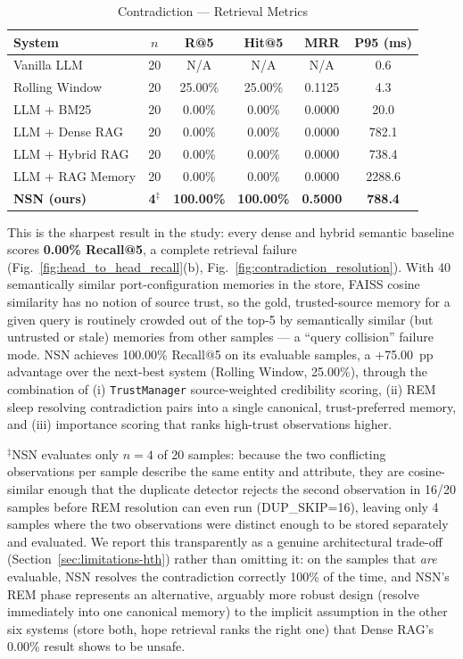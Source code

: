 \documentclass[conference]{IEEEtran}
\begin{document}
\begin{table}[t]
\caption{Contradiction --- Retrieval Metrics}
\label{tab:contra}
\centering
\scriptsize
\begin{tabular}{@{}lccccc@{}}
\toprule
\textbf{System} & $n$ & \textbf{R@5} & \textbf{Hit@5} & \textbf{MRR} & \textbf{P95 (ms)} \\
\midrule
Vanilla LLM & 20 & N/A & N/A & N/A & 0.6 \\
Rolling Window & 20 & 25.00\% & 25.00\% & 0.1125 & 4.3 \\
LLM + BM25 & 20 & 0.00\% & 0.00\% & 0.0000 & 20.0 \\
LLM + Dense RAG & 20 & 0.00\% & 0.00\% & 0.0000 & 782.1 \\
LLM + Hybrid RAG & 20 & 0.00\% & 0.00\% & 0.0000 & 738.4 \\
LLM + RAG Memory & 20 & 0.00\% & 0.00\% & 0.0000 & 2288.6 \\
\textbf{NSN (ours)} & \textbf{4}$^{\ddagger}$ & \textbf{100.00\%} & \textbf{100.00\%} & \textbf{0.5000} & \textbf{788.4} \\
\bottomrule
\end{tabular}
\end{table}

This is the sharpest result in the study: every dense and hybrid semantic baseline scores \textbf{0.00\% Recall@5}, a complete retrieval failure (Fig.~\ref{fig:head_to_head_recall}(b), Fig.~\ref{fig:contradiction_resolution}). With 40 semantically similar port-configuration memories in the store, FAISS cosine similarity has no notion of source trust, so the gold, trusted-source memory for a given query is routinely crowded out of the top-5 by semantically similar (but untrusted or stale) memories from other samples --- a ``query collision'' failure mode. NSN achieves 100.00\% Recall@5 on its evaluable samples, a +75.00~pp advantage over the next-best system (Rolling Window, 25.00\%), through the combination of (i) \texttt{TrustManager} source-weighted credibility scoring, (ii) REM sleep resolving contradiction pairs into a single canonical, trust-preferred memory, and (iii) importance scoring that ranks high-trust observations higher.

$^{\ddagger}$NSN evaluates only $n=4$ of 20 samples: because the two conflicting observations per sample describe the same entity and attribute, they are cosine-similar enough that the duplicate detector rejects the second observation in 16/20 samples before REM resolution can even run (DUP\_SKIP=16), leaving only 4 samples where the two observations were distinct enough to be stored separately and evaluated. We report this transparently as a genuine architectural trade-off (Section~\ref{sec:limitations-hth}) rather than omitting it: on the samples that \emph{are} evaluable, NSN resolves the contradiction correctly 100\% of the time, and NSN's REM phase represents an alternative, arguably more robust design (resolve immediately into one canonical memory) to the implicit assumption in the other six systems (store both, hope retrieval ranks the right one) that Dense RAG's 0.00\% result shows to be unsafe.
\end{document}

